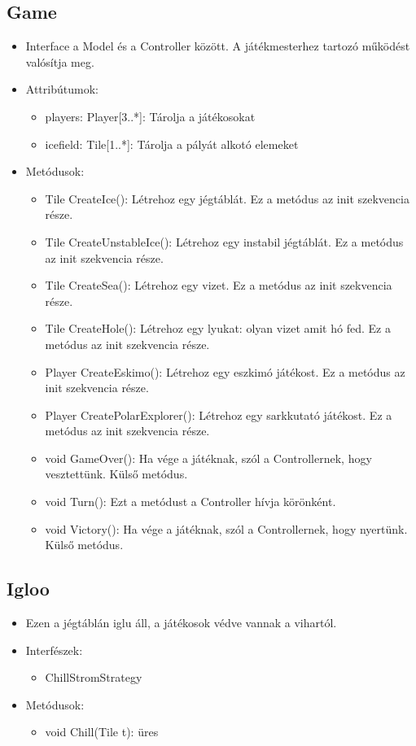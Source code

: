 \subsection{Game}
\begin{itemize}
	\item Interface a Model és a Controller között. A játékmesterhez tartozó működést valósítja meg.
	
\item Attribútumok:

\begin{itemize}
	\item players: Player[3..*]: Tárolja a játékosokat
	\item icefield: Tile[1..*]: Tárolja a pályát alkotó elemeket
\end{itemize}
\item Metódusok:
\begin{itemize}
	\item Tile CreateIce(): Létrehoz egy jégtáblát. Ez a metódus az init szekvencia része.
	\item Tile CreateUnstableIce(): Létrehoz egy instabil jégtáblát. Ez a metódus az init szekvencia része.
	\item Tile CreateSea(): Létrehoz egy vizet. Ez a metódus az init szekvencia része.
	\item Tile CreateHole(): Létrehoz egy lyukat: olyan vizet amit hó fed. Ez a metódus az init szekvencia része.
	\item Player CreateEskimo(): Létrehoz egy eszkimó játékost. Ez a metódus az init szekvencia része.
	\item Player CreatePolarExplorer(): Létrehoz egy sarkkutató játékost. Ez a metódus az init szekvencia része.
	\item void GameOver(): Ha vége a játéknak, szól a Controllernek, hogy vesztettünk. Külső metódus.
	\item void Turn(): Ezt a metódust a Controller hívja körönként. 
	\item void Victory(): Ha vége a játéknak, szól a Controllernek, hogy nyertünk. Külső metódus.
\end{itemize}
\end{itemize}

\subsection{Igloo}
\begin{itemize}
	\item Ezen a jégtáblán iglu áll, a játékosok védve vannak a vihartól.
	
\item Interfészek:
\begin{itemize} 
	\item ChillStromStrategy
\end{itemize}
\item Metódusok:
\begin{itemize}
	\item void Chill(Tile t): üres
\end{itemize}
\end{itemize}

